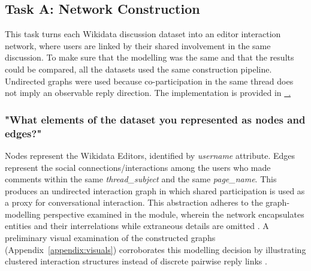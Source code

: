 \documentclass[acmsmall,nonacm,natbib=false]{acmart}
\newcommand{\githublink}[2]{\href{#1}{\faGithub\ #2}}
\begin{document}
\subsection{\LARGE{Task A: Network Construction}}

 This task turns each Wikidata discussion dataset into an editor interaction network, where users are linked by their shared involvement in the same discussion. To make sure that the modelling was the same and that the results could be compared, all the datasets used the same construction pipeline. Undirected graphs were used because co-participation in the same thread does not imply an observable
reply direction. The implementation is provided in \githublink{https://github.kcl.ac.uk/k25038453/network-data-analysis-coursework/blob/main/notebooks/part\_1/taskA.ipynb}.


\subsubsection{\large{\textbf{"What elements of the dataset you represented as nodes and edges?"}}}
\leavevmode \par \noindent
Nodes represent the Wikidata Editors, identified by \textit{username} attribute. Edges represent the social connections/interactions among the users who made comments within the same \textit{thread\_subject} and the same \textit{page\_name}. This produces an undirected interaction graph in which shared participation is used as a proxy for conversational interaction.  
This abstraction adheres to the graph-modelling perspective examined in the module, wherein the network encapsulates entities and their interrelations while extraneous details are omitted \cite{easley2010networks}.
A preliminary visual examination of the constructed graphs (Appendix~\ref{appendix:visuals}) corroborates this modelling decision by illustrating clustered interaction structures instead of discrete pairwise reply links \cite{newman2010networks, easley2010networks}.
\end{document}
